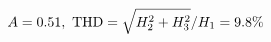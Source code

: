 \documentclass[preview]{standalone}
\begin{document}
\begin{align*}
\special{dvisvgm:raw <g id='unique000'>}A=0.51,\ \text{THD}=\sqrt{H_2^2+H_3^2}/H_1=9.8\%\special{dvisvgm:raw </g>}
\end{align*}
\end{document}
